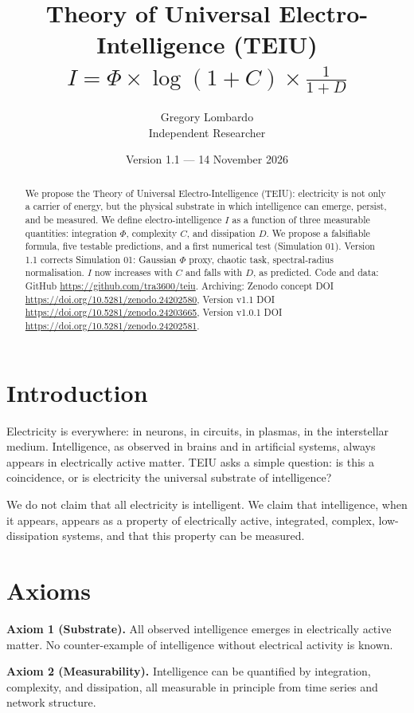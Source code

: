 \documentclass[11pt,a4paper]{article}
\title{Theory of Universal Electro-Intelligence (TEIU)\\[2mm]
\large $I = \Phi \times \log(1+C) \times \frac{1}{1+D}$}
\author{Gregory Lombardo\\Independent Researcher}
\date{Version 1.1 --- 14 November 2026}
\begin{document}
\maketitle

\begin{abstract}
We propose the Theory of Universal Electro-Intelligence (TEIU): electricity is not only a carrier of energy, but the physical substrate in which intelligence can emerge, persist, and be measured.
We define electro-intelligence $I$ as a function of three measurable quantities: integration $\Phi$, complexity $C$, and dissipation $D$.
We propose a falsifiable formula, five testable predictions, and a first numerical test (Simulation 01).
Version 1.1 corrects Simulation 01: Gaussian $\Phi$ proxy, chaotic task, spectral-radius normalisation. $I$ now increases with $C$ and falls with $D$, as predicted.
Code and data: GitHub \url{https://github.com/tra3600/teiu}.
Archiving: Zenodo concept DOI \url{https://doi.org/10.5281/zenodo.24202580}, Version v1.1 DOI \url{https://doi.org/10.5281/zenodo.24203665}, Version v1.0.1 DOI \url{https://doi.org/10.5281/zenodo.24202581}.
\end{abstract}

\section{Introduction}
Electricity is everywhere: in neurons, in circuits, in plasmas, in the interstellar medium. Intelligence, as observed in brains and in artificial systems, always appears in electrically active matter. TEIU asks a simple question: is this a coincidence, or is electricity the universal substrate of intelligence?

We do not claim that all electricity is intelligent. We claim that intelligence, when it appears, appears as a property of electrically active, integrated, complex, low-dissipation systems, and that this property can be measured.

\section{Axioms}
\textbf{Axiom 1 (Substrate).} All observed intelligence emerges in electrically active matter. No counter-example of intelligence without electrical activity is known.

\textbf{Axiom 2 (Measurability).} Intelligence can be quantified by integration, complexity, and dissipation, all measurable in principle from time series and network structure.
\end{document}
